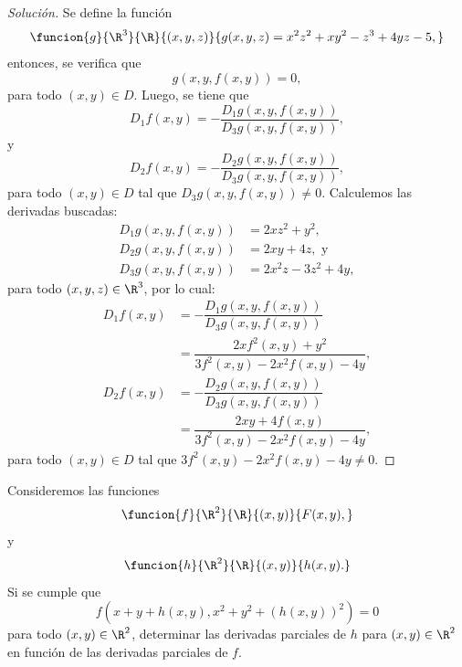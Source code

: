 \documentclass[a4,11pt]{aleph-notas}
\begin{document}
\begin{proof}[Solución]
Se define la función
    \[
    \funcion{g}{\R^3}{\R}
    {(x, y, z)}{g(x, y, z) = x^2 z^2 + x y^2 - z^3 + 4yz - 5,}
	\]
    entonces, se verifica que
    \[
    g(x, y, f(x, y)) = 0,
    \]
    para todo $(x, y)\in D$. Luego, se tiene que
    \[
    D_1 f(x, y) = -\dfrac{D_1 g(x, y, f(x, y))}{D_3 g(x, y, f(x, y))},
    \]
    y
    \[
    D_2 f(x, y) = -\dfrac{D_2 g(x, y, f(x, y))}{D_3 g(x, y, f(x, y))},
    \]
    para todo $(x, y) \in D$ tal que $D_3 g(x, y, f(x, y)) \neq 0$.
    Calculemos las derivadas buscadas:
    \begin{align*}
    D_1 g(x, y, f(x, y)) &= 2xz^2 + y^2,\\
    D_2 g(x, y, f(x, y)) &= 2xy + 4z, \mbox{ y}\\
    D_3 g(x, y, f(x, y)) &= 2x^2 z - 3z^2 + 4y,
    \end{align*}
    para todo $(x, y, z)\in\R^3$, por lo cual:
    \begin{align*}
        D_1 f(x, y) &= -\dfrac{D_1 g(x, y, f(x, y))}{D_3 g(x, y, f(x, y))}\\
        &= \dfrac{2xf^2(x, y) + y^2}{3f^2(x, y) - 2x^2 f(x, y) - 4y},
    \end{align*}
    \begin{align*}
        D_2 f(x, y) &= -\dfrac{D_2 g(x, y, f(x, y))}{D_3 g(x, y, f(x, y))}\\
        &= \dfrac{2xy + 4f(x, y)}{3f^2(x, y) - 2x^2 f(x, y) - 4y},
    \end{align*}
    para todo $(x, y)\in D$ tal que $3f^2(x, y) - 2x^2 f(x, y) - 4y \neq 0$.
\end{proof}

\begin{ejer}
Consideremos las funciones
    \[
        \funcion{f}{\R^2}{\R}{(x,y)}{F(x,y),}
    \]
    y 
    \[
        \funcion{h}{\R^2}{\R}{(x,y)}{h(x,y).}
    \]
    Si se cumple que
    \[
        f(x+y+h(x,y),x^2+y^2+(h(x,y))^2)=0
    \]
    para todo $(x,y)\in\R^2$, determinar las derivadas parciales de $h$ para $(x,y) \in\R^2$ en función de las derivadas parciales de $f$.
\end{ejer}
\end{document}
